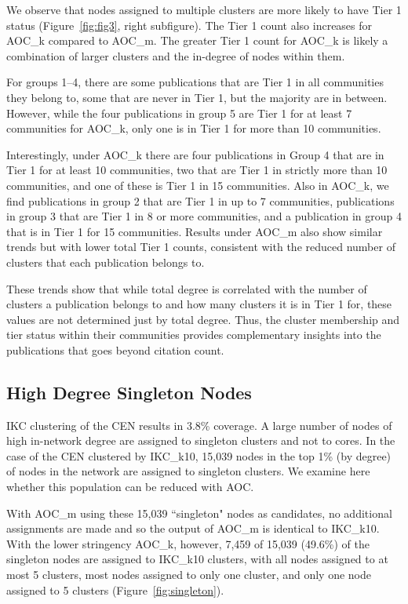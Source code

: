 \documentclass[12pt, oneside]{article}   	%
\begin{document}
We observe that nodes assigned to multiple clusters are more likely to have Tier 1 status (Figure~\ref{fig:fig3}, right subfigure). The Tier 1 count also increases for AOC\_k compared to AOC\_m. 
The greater Tier 1 count for AOC\_k is likely a combination of larger clusters and the in-degree of nodes within them.

For groups 1--4, there are some publications that are Tier 1 in all communities they belong to, some that are never in Tier 1, but the majority are in between. 
However, while the four publications in group 5 are Tier 1 for at least 7 communities for AOC\_k, only one is in Tier 1 for more than 10 communities. 

Interestingly, under AOC\_k there are four publications in Group 4 that are in Tier 1 for at least 10 communities, two that are Tier 1 in strictly more than 10 communities, and one of these is Tier 1 in 15 communities. Also in AOC\_k, we find publications in group 2 that are Tier 1 in up to 7 communities, publications in group 3 that are Tier 1 in 8 or more communities, and a publication in group 4 that is in Tier 1 for 15 communities. Results under AOC\_m also show similar trends but with lower total Tier 1 counts, consistent with the reduced number of clusters that each publication belongs to.
	
These trends show that while total degree is correlated with the number of clusters a publication belongs to and how many clusters it is in Tier 1 for,
these values are not determined just by total degree. Thus, the cluster membership and tier status within their communities provides complementary insights into  the publications that goes beyond citation count.
	
\subsection{High Degree Singleton Nodes} 
	
IKC clustering of the CEN results in 3.8\% coverage. A large number of nodes of high in-network degree are assigned to singleton clusters and not to cores. In the case of the CEN clustered by IKC\_k10, 15,039 nodes in the top 1\% (by degree) of nodes in the network are assigned to singleton clusters. We examine here whether this population can be reduced with AOC. 


With AOC\_m using these 15,039  ``singleton" nodes as candidates, no additional assignments are made and so the output of AOC\_m is identical to IKC\_k10. 
With the lower stringency AOC\_k, however, 7,459 of 15,039 (49.6\%) of the singleton nodes are assigned to IKC\_k10 clusters, with all nodes assigned to at most 5 clusters, most nodes assigned to only one cluster, and only one node assigned to 5 clusters (Figure~\ref{fig:singleton}). 
\end{document}
